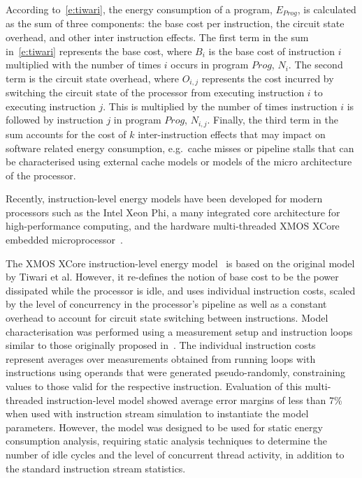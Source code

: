 According to~\ref{e:tiwari}, the energy consumption of a program, $E_{Prog}$, is
calculated as the sum of three components: the base cost per instruction, the
circuit state overhead, and other inter instruction effects.
%
The first term in the sum in~\ref{e:tiwari} represents the base cost, where $B_i$ is
the base cost of instruction $i$ multiplied with the number of times $i$ occurs
in program $\mathit{Prog}$, $N_i$.
%
The second term is the circuit state overhead, where $O_{i,j}$ represents the
cost incurred by switching the circuit state of the processor from executing
instruction $i$ to executing instruction $j$. This is multiplied by the number of
times instruction $i$ is followed by instruction $j$ in program $\mathit{Prog}$, $N_{i,j}$. 
%
Finally, the third term in the sum accounts for the cost of $k$ inter-instruction
effects that may impact on software related energy consumption, e.g.\ cache
misses or pipeline stalls that can be characterised using external cache models
or models of the micro architecture of the processor.


Recently, instruction-level energy models have been developed for modern
processors such as the Intel Xeon Phi, a many integrated core architecture for
high-performance computing, and the hardware multi-threaded XMOS XCore embedded
microprocessor~\cite{XMOS:Arch}.

The XMOS XCore instruction-level energy
model~\cite{DBLP:journals/tecs/KerrisonE15} is based on the original model by
Tiwari et al. However, it re-defines the notion of base cost to be the power
dissipated while the processor is idle, and uses individual instruction costs,
scaled by the level of concurrency in the processor's pipeline as well as a
constant overhead to account for circuit state switching between instructions.
%
Model characterisation was performed using a measurement setup and instruction
loops similar to those originally proposed in~\cite{Tiwari-embedded-1994}. The
individual instruction costs represent averages over measurements obtained from
running loops with instructions using operands that were generated
pseudo-randomly, constraining values to those valid for the respective
instruction.
%
Evaluation of this multi-threaded instruction-level model showed average error
margins of less than 7\% when used with instruction stream simulation to
instantiate the model parameters.
%
However, the model was designed to be used for static energy consumption analysis,
requiring static analysis techniques to determine the number of idle cycles and
the level of concurrent thread activity, in addition to the standard
instruction stream statistics.

